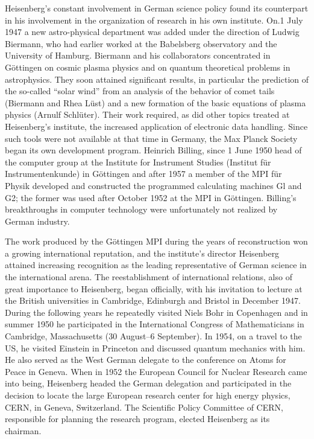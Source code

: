 \documentclass{article}
\begin{document}
Heisenberg's constant involvement in German science policy found its counterpart in his involvement in the organization of research in his own institute. On.1 July 1947 a new astro-physical department was added under the direction of Ludwig Biermann, who had earlier worked at the Babelsberg observatory and the University of Hamburg. Biermann and his collaborators concentrated in Göttingen on cosmic plasma physics and on quantum theoretical problems in astrophysics. They soon attained significant results, in particular the prediction of the so-called “solar wind” from an analysis of the behavior of comet tails (Biermann and Rhea Lüst) and a new formation of the basic equations of plasma physics (Arnulf Schlüter). Their work required, as did other topics treated at Heisenberg's institute, the increased application of electronic data handling. Since such tools were not available at that time in Germany, the Max Planck Society began its own development program. Heinrich Billing, since 1 June 1950 head of the computer group at the Institute for Instrument Studies (Institut für Instrumentenkunde) in Göttingen and after 1957 a member of the MPI für Physik developed and constructed the programmed calculating machines Gl and G2; the former was used after October 1952 at the MPI in Göttingen. Billing's breakthroughs in computer technology were unfortunately not realized by German industry.

The work produced by the Göttingen MPI during the years of reconstruction won a growing international reputation, and the institute's director Heisenberg attained increasing recognition as the leading representative of German science in the international arena. The reestablishment of international relations, also of great importance to Heisenberg, began officially, with his invitation to lecture at the British universities in Cambridge, Edinburgh and Bristol in December 1947. During the following years he repeatedly visited Niels Bohr in Copenhagen and in summer 1950 he participated in the International Congress of Mathematicians in Cambridge, Massachusetts (30 August--6 September). In 1954, on a travel to the US, he visited Einstein in Princeton and discussed quantum mechanics with him. He also served as the West German delegate to the conference on Atoms for Peace in Geneva. When in 1952 the European Council for Nuclear Research came into being, Heisenberg headed the German delegation and participated in the decision to locate the large European research center for high energy physics, CERN, in Geneva, Switzerland. The Scientific Policy Committee of CERN, responsible for planning the research program, elected Heisenberg as its chairman.
\end{document}
